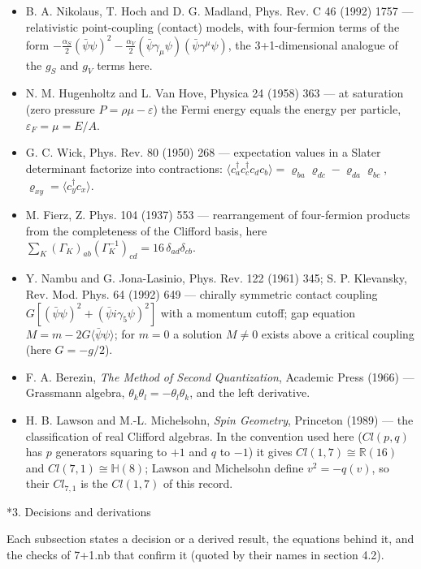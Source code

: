 \documentclass[10pt,a4paper]{article}
\makeatletter
\renewcommand\section{\@startsection{section}{1}{\z@}{-3.5ex \@plus -1ex \@minus -.2ex}{2.3ex \@plus.2ex}{\normalfont\Large\bfseries\raggedright}}
\makeatother
\begin{document}
\begin{itemize}
\item B. A. Nikolaus, T. Hoch and D. G. Madland, Phys. Rev. C 46 (1992) 1757 — relativistic point-coupling (contact) models, with four-fermion terms of the form $-\frac{\alpha_S}{2}(\bar\psi\psi)^2-\frac{\alpha_V}{2}(\bar\psi\gamma_\mu\psi)(\bar\psi\gamma^\mu\psi)$, the 3+1-dimensional analogue of the $g_S$ and $g_V$ terms here.
\item N. M. Hugenholtz and L. Van Hove, Physica 24 (1958) 363 — at saturation (zero pressure $P=\rho\mu-\varepsilon$) the Fermi energy equals the energy per particle, $\varepsilon_F=\mu=E/A$.
\item G. C. Wick, Phys. Rev. 80 (1950) 268 — expectation values in a Slater determinant factorize into contractions: $\langle c_a^\dagger c_c^\dagger c_dc_b\rangle=\varrho_{ba}\varrho_{dc}-\varrho_{da}\varrho_{bc}$, $\varrho_{xy}=\langle c_y^\dagger c_x\rangle$.
\item M. Fierz, Z. Phys. 104 (1937) 553 — rearrangement of four-fermion products from the completeness of the Clifford basis, here $\sum_K(\Gamma_K)_{ab}(\Gamma_K^{-1})_{cd}=16\,\delta_{ad}\delta_{cb}$.
\item Y. Nambu and G. Jona-Lasinio, Phys. Rev. 122 (1961) 345; S. P. Klevansky, Rev. Mod. Phys. 64 (1992) 649 — chirally symmetric contact coupling $G[(\bar\psi\psi)^2+(\bar\psi i\gamma_5\psi)^2]$ with a momentum cutoff; gap equation $M=m-2G\langle\bar\psi\psi\rangle$; for $m=0$ a solution $M\neq0$ exists above a critical coupling (here $G=-g/2$).
\item F. A. Berezin, \emph{The Method of Second Quantization}, Academic Press (1966) — Grassmann algebra, $\theta_k\theta_l=-\theta_l\theta_k$, and the left derivative.
\item H. B. Lawson and M.-L. Michelsohn, \emph{Spin Geometry}, Princeton (1989) — the classification of real Clifford algebras. In the convention used here ($Cl(p,q)$ has $p$ generators squaring to $+1$ and $q$ to $-1$) it gives $Cl(1,7)\cong\mathbb R(16)$ and $Cl(7,1)\cong\mathbb H(8)$; Lawson and Michelsohn define $v^2=-q(v)$, so their $Cl_{7,1}$ is the $Cl(1,7)$ of this record.
\end{itemize}
\section*{3. Decisions and derivations}
Each subsection states a decision or a derived result, the equations behind it, and the checks of 7+1.nb that confirm it (quoted by their names in section 4.2).
\end{document}
